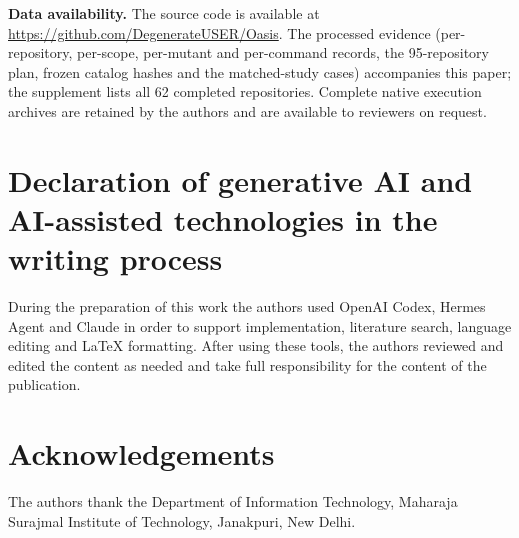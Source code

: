 \documentclass[3p,times,procedia]{elsarticle}
\begin{document}
\textbf{Data availability.} The source code is available at \url{https://github.com/DegenerateUSER/Oasis}. The processed evidence (per-repository, per-scope, per-mutant and per-command records, the 95-repository plan, frozen catalog hashes and the matched-study cases) accompanies this paper; the supplement lists all 62 completed repositories. Complete native execution archives are retained by the authors and are available to reviewers on request.

\section*{Declaration of generative AI and AI-assisted technologies in the writing process}
During the preparation of this work the authors used OpenAI Codex, Hermes Agent and Claude in order to support implementation, literature search, language editing and LaTeX formatting. After using these tools, the authors reviewed and edited the content as needed and take full responsibility for the content of the publication.

\section*{Acknowledgements}
The authors thank the Department of Information Technology, Maharaja Surajmal Institute of Technology, Janakpuri, New Delhi.


\label{lastmanuscriptpage}
\clearpage

\end{document}
